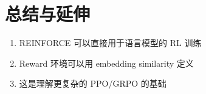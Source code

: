 \section{总结与延伸}
\begin{enumerate}
  \item REINFORCE 可以直接用于语言模型的 RL 训练
  \item Reward 环境可以用 embedding similarity 定义
  \item 这是理解更复杂的 PPO/GRPO 的基础
\end{enumerate}

